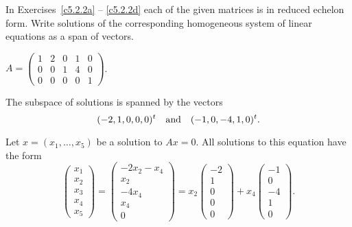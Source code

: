 \documentclass{ximera}
\begin{document}
\noindent In Exercises~\ref{c5.2.2a} -- \ref{c5.2.2d} each of the
given matrices is in reduced echelon form.  Write solutions of the
corresponding homogeneous system of linear equations as a span of vectors.
\begin{exercise} \label{c5.2.2a}
$A = \left(\begin{array}{rrrrr} 1 & 2 & 0 & 1 & 0 \\
	0 & 0 & 1 & 4 & 0 \\ 0 & 0 & 0 & 0 & 1 \end{array}\right)$.

\begin{solution}

\ans The subspace of solutions is spanned by the vectors
\[
(-2,1,0,0,0)^t \quad\mbox{and}\quad (-1,0,-4,1,0)^t.
\]

\soln Let $x = (x_1,\dots ,x_5)$ be a solution to $Ax = 0$.  All
solutions to this equation have the form
\[
\left(\begin{array}{r} x_1 \\ x_2 \\ x_3 \\ x_4 \\ x_5
\end{array}\right) = \left(\begin{array}{c} -2x_2 - x_4 \\ x_2 \\
-4x_4 \\ x_4 \\ 0 \end{array}\right) = x_2\left(\begin{array}{r}
-2 \\ 1 \\ 0 \\ 0 \\ 0 \end{array}\right) +
x_4\left(\begin{array}{r} -1 \\ 0 \\ -4 \\ 1 \\ 0
\end{array}\right).
\]

\end{solution}
\end{exercise}
\end{document}
